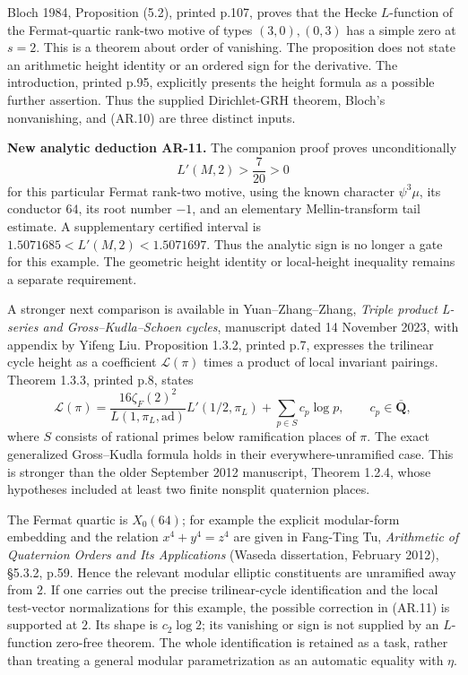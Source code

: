 \documentclass[11pt,a4paper]{article}
\begin{document}
Bloch 1984, Proposition (5.2), printed p.107, proves that the Hecke
\(L\)-function of the Fermat-quartic rank-two motive of types
\((3,0),(0,3)\) has a simple zero at \(s=2\). This is a theorem about
order of vanishing. The proposition does not state an arithmetic height
identity or an ordered sign for the derivative. The introduction,
printed p.95, explicitly presents the height formula as a possible
further assertion. Thus the supplied Dirichlet-GRH theorem, Bloch's
nonvanishing, and (AR.10) are three distinct inputs.

\textbf{New analytic deduction AR-11.} The companion proof
 proves unconditionally \[
L'(M,2)>\frac7{20}>0
\] for this particular Fermat rank-two motive, using the known character
\(\psi^3\mu\), its conductor \(64\), its root number \(-1\), and an
elementary Mellin-transform tail estimate. A supplementary certified
interval is \(1.5071685<L'(M,2)<1.5071697\). Thus the analytic sign is
no longer a gate for this example. The geometric height identity or
local-height inequality remains a separate requirement.

A stronger next comparison is available in Yuan--Zhang--Zhang,
\emph{Triple product L-series and Gross--Kudla--Schoen cycles},
manuscript dated 14 November 2023, with appendix by Yifeng Liu.
Proposition 1.3.2, printed p.7, expresses the trilinear cycle height as
a coefficient \(\mathcal L(\pi)\) times a product of local invariant
pairings. Theorem 1.3.3, printed p.8, states \[
\mathcal L(\pi)=
\frac{16\zeta_F(2)^2}{L(1,\pi_L,\mathrm{ad})}
 L'(1/2,\pi_L)+\sum_{p\in S}c_p\log p,
\qquad c_p\in\overline{\mathbf Q},
\tag{AR.11}
\] where \(S\) consists of rational primes below ramification places of
\(\pi\). The exact generalized Gross--Kudla formula holds in their
everywhere-unramified case. This is stronger than the older September
2012 manuscript, Theorem 1.2.4, whose hypotheses included at least two
finite nonsplit quaternion places.

The Fermat quartic is \(X_0(64)\); for example the explicit modular-form
embedding and the relation \(x^4+y^4=z^4\) are given in Fang-Ting Tu,
\emph{Arithmetic of Quaternion Orders and Its Applications} (Waseda
dissertation, February 2012), §5.3.2, p.59. Hence the relevant modular
elliptic constituents are unramified away from \(2\). If one carries out
the precise trilinear-cycle identification and the local test-vector
normalizations for this example, the possible correction in (AR.11) is
supported at \(2\). Its shape is \(c_2\log2\); its vanishing or sign is
not supplied by an \(L\)-function zero-free theorem. The whole
identification is retained as a task, rather than treating a general
modular parametrization as an automatic equality with \(\eta\).
\end{document}
